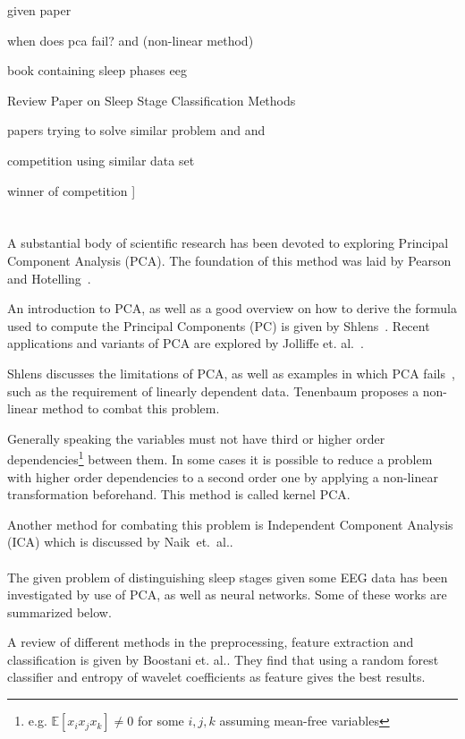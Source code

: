 \documentclass[a4paper]{IEEEtran}
\begin{document}
given paper \cite{Jolliffe2016}

when does pca fail? \cite{Shlens2014} and \cite{Tenenbaum2000} (non-linear method)

book containing sleep phases eeg \cite{Ganong1997}

Review Paper on Sleep Stage Classification Methods \cite{Boostani2017}

papers trying to solve similar problem \cite{Tautan2021} and \cite{Putilov2015} and \cite{Metzner2023}

competition using similar data set \cite{Ghassemi2018}

winner of competition \cite{Howe2018}]
\\
\\
\\
A substantial body of scientific research has been devoted to exploring Principal Component Analysis (PCA).
The foundation of this method was laid by Pearson~\cite{Pearson1901} and Hotelling~\cite{Hotelling1933}.

An introduction to PCA, as well as a good overview on how to derive the formula used to compute the Principal Components (PC) is given by Shlens~\cite{Shlens2014}.
Recent applications and variants of PCA are explored by Jolliffe et. al.~\cite{Jolliffe2016}.

Shlens discusses the limitations of PCA, as well as examples in which PCA fails~\cite{Shlens2014}, such as the requirement of linearly dependent data.
Tenenbaum proposes a non-linear method to combat this problem\cite{Tenenbaum2000}.

Generally speaking the variables must not have third or higher order dependencies\footnote{e.g. $\mathbb{E}[x_ix_jx_k] \neq 0$ for some $i, j, k$ assuming mean-free variables} between them. In some cases it is possible to reduce a problem with higher order dependencies to a second order one by applying a non-linear transformation beforehand. This method is called kernel PCA\cite{Shlens2014}.

Another method for combating this problem is Independent Component Analysis (ICA) which is discussed by Naik~et.~al.\cite{Naik2011}.
\\
\\
The given problem of distinguishing sleep stages given some EEG data has been investigated by use of PCA, as well as neural networks. Some of these works are summarized below.

A review of different methods in the preprocessing, feature extraction and classification is given by Boostani et. al.\cite{Boostani2017}. They find that using a random forest classifier and entropy of wavelet coefficients as feature gives the best results.
\end{document}
